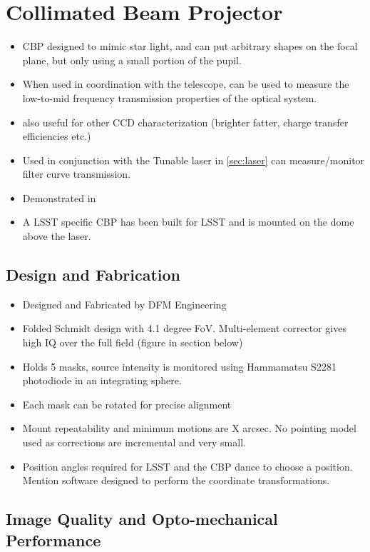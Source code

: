 \section{Collimated Beam Projector}

\begin{itemize}
	\item CBP designed to mimic star light, and can put arbitrary shapes on the focal plane, but only using a small portion of the pupil. 
	\item When used in coordination with the telescope, can be used to measure the low-to-mid frequency transmission properties of the optical system.
	\item also useful for other CCD characterization (brighter fatter, charge transfer efficiencies etc.)
	\item Used in conjunction with the Tunable laser in \ref{sec:laser} can measure/monitor filter curve transmission.
	\item Demonstrated in \cite{Coughlin2016, Coughlin2018}
	\item A LSST specific CBP has been built for LSST and is mounted on the dome above the laser.
\end{itemize}


\subsection{Design and Fabrication}

\begin{itemize}
	\item Designed and Fabricated by DFM Engineering
	\item Folded Schmidt design with 4.1 degree FoV. Multi-element corrector gives high IQ over the full field (figure in section below)
	\item Holds 5 masks, source intensity is monitored using Hammamatsu S2281 photodiode in an integrating sphere.
	\item Each mask can be rotated for precise alignment
	\item Mount repeatability and minimum motions are X arcsec. No pointing model used as corrections are incremental and very small.
	\item Position angles required for LSST and the CBP dance to choose a position. Mention software designed to perform the coordinate transformations.
\end{itemize}

\subsection{Image Quality and Opto-mechanical Performance}

